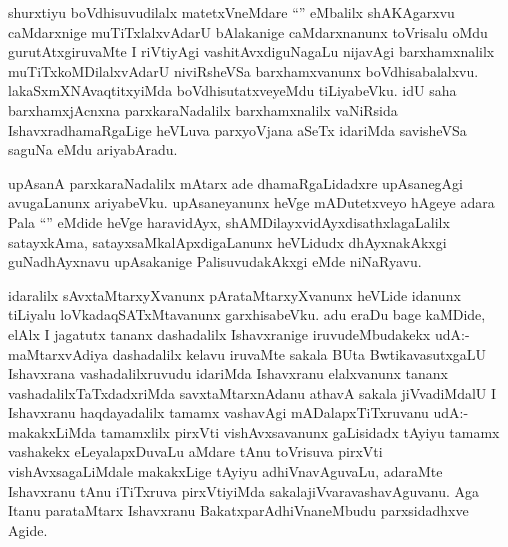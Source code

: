 \begin{artha}
shurxtiyu boVdhisuvudilalx matetxVneMdare ``\stext'' eMbalilx shAKAgarxvu caMdarxnige muTiTxlalxvAdarU bAlakanige caMdarxnanunx toVrisalu oMdu gurutAtxgiruvaMte I riVtiyAgi vashitAvxdiguNagaLu nijavAgi barxhamxnalilx muTiTxkoMDilalxvAdarU niviRsheVSa barxhamxvanunx boVdhisabalalxvu. lakaSxmXNAvaqtitxyiMda boVdhisutatxveyeMdu tiLiyabeVku. idU saha barxhamxjAcnxna parxkaraNadalilx barxhamxnalilx vaNiRsida IshavxradhamaRgaLige heVLuva parxyoVjana aSeTx idariMda savisheVSa saguNa eMdu ariyabAradu.

upAsanA parxkaraNadalilx mAtarx ade dhamaRgaLidadxre upAsanegAgi avugaLanunx ariyabeVku. upAsaneyanunx heVge mADutetxveyo hAgeye adara Pala ``\stext'' eMdide heVge haravidAyx, shAMDilayxvidAyxdisathxlagaLalilx satayxkAma, satayxsaMkalApxdigaLanunx heVLidudx dhAyxnakAkxgi guNadhAyxnavu upAsakanige PalisuvudakAkxgi eMde niNaRyavu.
\end{artha}


\begin{artha}
idaralilx sAvxtaMtarxyXvanunx pArataMtarxyXvanunx heVLide idanunx tiLiyalu loVkadaqSATxMtavanunx garxhisabeVku. adu eraDu bage kaMDide, elAlx I jagatutx tananx dashadalilx Ishavxranige iruvudeMbudakekx udA:- maMtarxvAdiya dashadalilx kelavu iruvaMte sakala BUta BwtikavasutxgaLU Ishavxrana vashadalilxruvudu idariMda Ishavxranu elalxvanunx tananx vashadalilxTaTxdadxriMda savxtaMtarxnAdanu athavA sakala jiVvadiMdalU  I Ishavxranu haqdayadalilx tamamx vashavAgi mADalapxTiTxruvanu udA:- makakxLiMda tamamxlilx pirxVti vishAvxsavanunx gaLisidadx tAyiyu tamamx vashakekx eLeyalapxDuvaLu aMdare tAnu toVrisuva pirxVti vishAvxsagaLiMdale makakxLige tAyiyu adhiVnavAguvaLu, adaraMte Ishavxranu tAnu iTiTxruva pirxVtiyiMda sakalajiVvaravashavAguvanu. Aga Itanu parataMtarx Ishavxranu BakatxparAdhiVnaneMbudu parxsidadhxve Agide. 
\end{artha}


